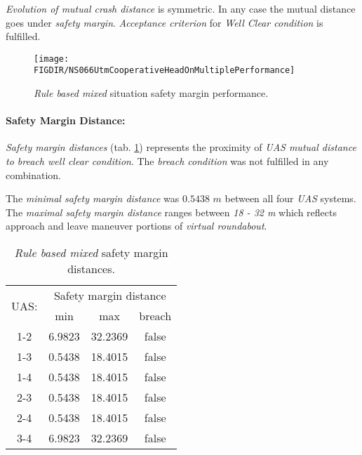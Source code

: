    \begin{note}
        \emph{Evolution of mutual crash distance} is symmetric. In any case the mutual distance goes under \emph{safety margin}. \emph{Acceptance criterion} for \emph{Well Clear condition} is fulfilled.
    \end{note}
        
    \begin{figure}[H]
        \centering
        \texttt{[image: \\FIGDIR/NS066UtmCooperativeHeadOnMultiplePerformance]}
        \caption{\emph{Rule based mixed} situation safety margin performance.}
        \label{fig:testRuleBasedMultipleAvoidancePerformance}
    \end{figure}
    
\paragraph{Safety Margin Distance:} \emph{Safety margin distances} (tab. \ref{tab:testCaseRuleBasedMixedSafetyMarginDistances}) represents the proximity of \emph{UAS mutual distance to breach well clear condition}. The \emph{breach condition} was not fulfilled in any combination. 
    
    The \emph{minimal safety margin distance} was $0.5438$ $m$ between all four \emph{UAS} systems. The \emph{maximal safety margin distance} ranges between \emph{18 - 32 m} which reflects approach and leave maneuver portions of \emph{virtual roundabout}.
    
    \begin{table}[H]
        \centering
        \begin{tabular}{c||c|c|c}
            \multirow{2}{*}{UAS:} & \multicolumn{3}{c}{Safety margin distance} \\ \cline{2-4} 
                      & min          & max         & breach         \\ \hline\hline
                1-2   & 6.9823       & 32.2369     & false          \\ \hline
                1-3   & 0.5438       & 18.4015     & false          \\ \hline
                1-4   & 0.5438       & 18.4015     & false          \\ \hline
                2-3   & 0.5438       & 18.4015     & false          \\ \hline
                2-4   & 0.5438       & 18.4015     & false          \\ \hline
                3-4   & 6.9823       & 32.2369     & false          \\ 
        \end{tabular}
        \caption{\emph{Rule based mixed} safety margin distances.}
        \label{tab:testCaseRuleBasedMixedSafetyMarginDistances}
    \end{table}
    
